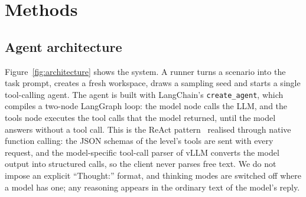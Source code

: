 \section{Methods}
\label{sec:methods}

\subsection{Agent architecture}
\label{sec:architecture}

Figure~\ref{fig:architecture} shows the system. A runner turns a scenario into the task prompt, creates a fresh workspace, draws a sampling seed and starts a single tool-calling agent. The agent is built with LangChain's \texttt{create\_agent}, which compiles a two-node LangGraph loop: the model node calls the LLM, and the tools node executes the tool calls that the model returned, until the model answers without a tool call. This is the ReAct pattern~\citep{yao2023react} realised through native function calling: the JSON schemas of the level's tools are sent with every request, and the model-specific tool-call parser of vLLM converts the model output into structured calls, so the client never parses free text. We do not impose an explicit ``Thought:'' format, and thinking modes are switched off where a model has one; any reasoning appears in the ordinary text of the model's reply.

